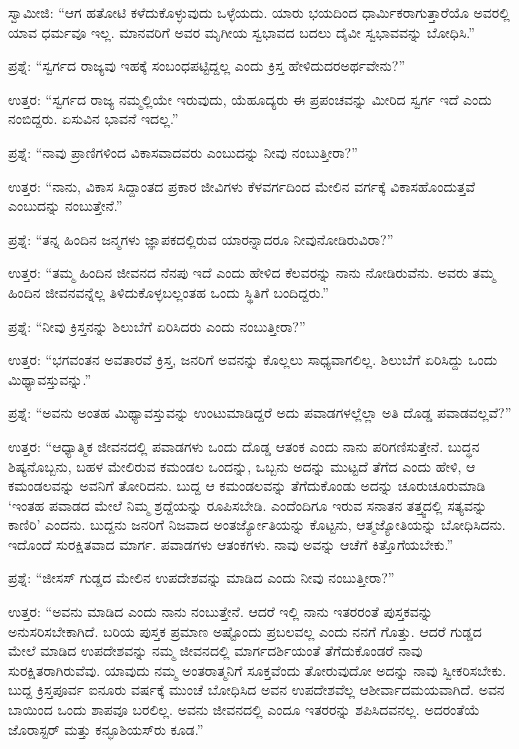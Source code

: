 ಸ್ವಾಮೀಜಿ: “ಆಗ ಹತೋಟಿ ಕಳೆದುಕೊಳ್ಳುವುದು ಒಳ್ಳೆಯದು. ಯಾರು ಭಯದಿಂದ ಧಾರ್ಮಿಕರಾಗುತ್ತಾರೆಯೊ ಅವರಲ್ಲಿ ಯಾವ ಧರ್ಮವೂ ಇಲ್ಲ. ಮಾನವರಿಗೆ ಅವರ ಮೃಗೀಯ ಸ್ವಭಾವದ ಬದಲು ದೈವೀ ಸ್ವಭಾವವನ್ನು ಬೋಧಿಸಿ.”

ಪ್ರಶ್ನೆ: “ಸ್ವರ್ಗದ ರಾಜ್ಯವು ಇಹಕ್ಕೆ ಸಂಬಂಧಪಟ್ಟಿದ್ದಲ್ಲ ಎಂದು ಕ್ರಿಸ್ತ ಹೇಳಿದುದರ\break ಅರ್ಥವೇನು?''

ಉತ್ತರ: “ಸ್ವರ್ಗದ ರಾಜ್ಯ ನಮ್ಮಲ್ಲಿಯೇ ಇರುವುದು, ಯೆಹೂದ್ಯರು ಈ ಪ್ರಪಂಚವನ್ನು ಮೀರಿದ ಸ್ವರ್ಗ ಇದೆ ಎಂದು ನಂಬಿದ್ದರು. ಏಸುವಿನ ಭಾವನೆ ಇದಲ್ಲ.”

ಪ್ರಶ್ನೆ: “ನಾವು ಪ್ರಾಣಿಗಳಿಂದ ವಿಕಾಸವಾದವರು ಎಂಬುದನ್ನು ನೀವು ನಂಬುತ್ತೀರಾ?''

ಉತ್ತರ: “ನಾನು, ವಿಕಾಸ ಸಿದ್ದಾಂತದ ಪ್ರಕಾರ ಜೀವಿಗಳು ಕೆಳವರ್ಗದಿಂದ ಮೇಲಿನ ವರ್ಗಕ್ಕೆ ವಿಕಾಸಹೊಂದುತ್ತವೆ ಎಂಬುದನ್ನು ನಂಬುತ್ತೇನೆ.”

ಪ್ರಶ್ನೆ: “ತನ್ನ ಹಿಂದಿನ ಜನ್ಮಗಳು ಜ್ಞಾಪಕದಲ್ಲಿರುವ ಯಾರನ್ನಾದರೂ ನೀವು\break ನೋಡಿರುವಿರಾ?”

ಉತ್ತರ: “ತಮ್ಮ ಹಿಂದಿನ ಜೀವನದ ನೆನಪು ಇದೆ ಎಂದು ಹೇಳಿದ ಕೆಲವರನ್ನು ನಾನು ನೋಡಿರುವೆನು. ಅವರು ತಮ್ಮ ಹಿಂದಿನ ಜೀವನವನ್ನೆಲ್ಲ ತಿಳಿದುಕೊಳ್ಳಬಲ್ಲಂತಹ ಒಂದು ಸ್ಥಿತಿಗೆ ಬಂದಿದ್ದರು.''

ಪ್ರಶ್ನೆ: “ನೀವು ಕ್ರಿಸ್ತನನ್ನು ಶಿಲುಬೆಗೆ ಏರಿಸಿದರು ಎಂದು ನಂಬುತ್ತೀರಾ?”

ಉತ್ತರ: “ಭಗವಂತನ ಅವತಾರವೆ ಕ್ರಿಸ್ತ, ಜನರಿಗೆ ಅವನನ್ನು ಕೊಲ್ಲಲು ಸಾಧ್ಯವಾಗಲಿಲ್ಲ. ಶಿಲುಬೆಗೆ ಏರಿಸಿದ್ದು ಒಂದು ಮಿಥ್ಯಾವಸ್ತುವನ್ನು.”

ಪ್ರಶ್ನೆ: “ಅವನು ಅಂತಹ ಮಿಥ್ಯಾವಸ್ತುವನ್ನು ಉಂಟುಮಾಡಿದ್ದರೆ ಅದು ಪವಾಡಗಳಲ್ಲೆಲ್ಲಾ ಅತಿ ದೊಡ್ಡ ಪವಾಡವಲ್ಲವೆ?”

ಉತ್ತರ: “ಆಧ್ಯಾತ್ಮಿಕ ಜೀವನದಲ್ಲಿ ಪವಾಡಗಳು ಒಂದು ದೊಡ್ಡ ಆತಂಕ ಎಂದು ನಾನು ಪರಿಗಣಿಸುತ್ತೇನೆ. ಬುದ್ಧನ ಶಿಷ್ಯನೊಬ್ಬನು, ಬಹಳ ಮೇಲಿರುವ ಕಮಂಡಲ ಒಂದನ್ನು, ಒಬ್ಬನು ಅದನ್ನು ಮುಟ್ಟದೆ ತೆಗೆದ ಎಂದು ಹೇಳಿ, ಆ ಕಮಂಡಲವನ್ನು ಅವನಿಗೆ ತೋರಿದನು. ಬುದ್ದ ಆ ಕಮಂಡಲವನ್ನು ತೆಗೆದುಕೊಂಡು ಅದನ್ನು ಚೂರುಚೂರುಮಾಡಿ `ಇಂತಹ ಪವಾಡದ ಮೇಲೆ ನಿಮ್ಮ ಶ್ರದ್ದೆಯನ್ನು ರೂಪಿಸಬೇಡಿ. ಎಂದೆಂದಿಗೂ ಇರುವ ಸನಾತನ ತತ್ತ್ವದಲ್ಲಿ ಸತ್ಯವನ್ನು ಕಾಣಿರಿ' ಎಂದನು. ಬುದ್ದನು ಜನರಿಗೆ ನಿಜವಾದ ಅಂತರ್ಜ್ಯೋತಿಯನ್ನು ಕೊಟ್ಟನು, ಆತ್ಮಜ್ಯೋತಿಯನ್ನು ಬೋಧಿಸಿದನು. ಇದೊಂದೆ ಸುರಕ್ಷಿತವಾದ ಮಾರ್ಗ. ಪವಾಡಗಳು ಆತಂಕಗಳು. ನಾವು ಅವನ್ನು ಆಚೆಗೆ ಕಿತ್ತೊಗೆಯಬೇಕು.”

ಪ್ರಶ್ನೆ: “ಜೀಸಸ್ ಗುಡ್ಡದ ಮೇಲಿನ ಉಪದೇಶವನ್ನು ಮಾಡಿದ ಎಂದು ನೀವು ನಂಬುತ್ತೀರಾ?”

ಉತ್ತರ: “ಅವನು ಮಾಡಿದ ಎಂದು ನಾನು ನಂಬುತ್ತೇನೆ. ಆದರೆ ಇಲ್ಲಿ ನಾನು ಇತರರಂತೆ ಪುಸ್ತಕವನ್ನು ಅನುಸರಿಸಬೇಕಾಗಿದೆ. ಬರಿಯ ಪುಸ್ತಕ ಪ್ರಮಾಣ ಅಷ್ಟೊಂದು ಪ್ರಬಲವಲ್ಲ ಎಂದು ನನಗೆ ಗೊತ್ತು. ಆದರೆ ಗುಡ್ಡದ ಮೇಲೆ ಮಾಡಿದ ಉಪದೇಶವನ್ನು ನಮ್ಮ ಜೀವನದಲ್ಲಿ ಮಾರ್ಗದರ್ಶಿಯಂತೆ ತೆಗೆದುಕೊಂಡರೆ ನಾವು ಸುರಕ್ಷಿತರಾಗಿರುವೆವು. ಯಾವುದು ನಮ್ಮ ಅಂತರಾತ್ಮನಿಗೆ ಸೂಕ್ತವೆಂದು ತೋರುವುದೋ ಅದನ್ನು ನಾವು ಸ್ವೀಕರಿಸಬೇಕು. ಬುದ್ದ ಕ್ರಿಸ್ತಪೂರ್ವ ಐನೂರು ವರ್ಷಕ್ಕೆ ಮುಂಚೆ ಬೋಧಿಸಿದ ಅವನ ಉಪದೇಶವೆಲ್ಲ ಆಶೀರ್ವಾದಮಯವಾಗಿದೆ. ಅವನ ಬಾಯಿಂದ ಒಂದು ಶಾಪವೂ ಬರಲಿಲ್ಲ. ಅವನು ಜೀವನದಲ್ಲಿ ಎಂದೂ ಇತರರನ್ನು ಶಪಿಸಿದವನಲ್ಲ. ಅದರಂತೆಯೆ ಜೊರಾಸ್ಟರ್‌ ಮತ್ತು ಕನ್ಫೂಶಿಯಸ್‌ರು ಕೂಡ.”

